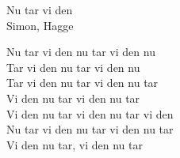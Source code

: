   {\Large Nu tar vi den}\\{\tiny Simon, Hagge}
  \begin{vers}
Nu tar vi den nu tar vi den nu\\
Tar vi den nu tar vi den nu\\
Tar vi den nu tar vi den nu tar\\
Vi den nu tar vi den nu tar\\
Vi den nu tar vi den nu tar vi den\\
Nu tar vi den nu tar vi den nu tar\\
Vi den nu tar, vi den nu tar
\end{vers}